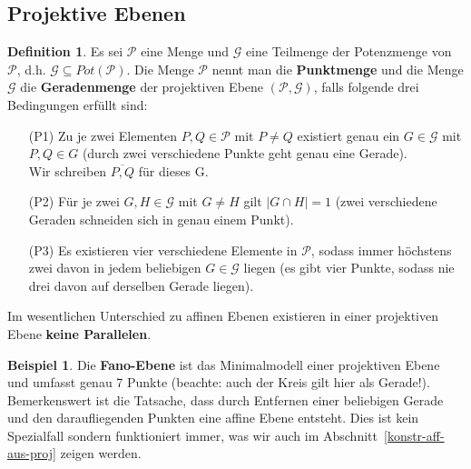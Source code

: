 \documentclass[hidelinks]{article}
\theoremstyle{plain}
\theoremstyle{definition}
\newtheorem{defn}[thm]{Definition}
\newtheorem{bsp}[thm]{Beispiel}
\theoremstyle{rem}
\begin{document}
\begin{sloppypar}
\subsection{Projektive Ebenen}
\begin{defn} \label{projektive-ebene}
Es sei $\mathcal{P}$ eine Menge und $\mathcal{G}$ eine Teilmenge der Potenzmenge von $\mathcal{P}$, d.h. $\mathcal{G}\subseteq Pot(\mathcal{P})$.
Die Menge $\mathcal{P}$ nennt man die \textbf{Punktmenge} und die Menge $\mathcal{G}$ die \textbf{Geradenmenge} der projektiven Ebene $(\mathcal{P},\mathcal{G})$, falls folgende drei Bedingungen erfüllt sind:
	\begin{enumerate}
		\item[(P1)] Zu je zwei Elementen $P, Q\in \mathcal{P}$ mit $P\ne Q$ existiert genau ein $G\in\mathcal{G}$ mit $P, Q \in G$ (durch zwei verschiedene Punkte geht genau eine Gerade).\\
		Wir schreiben $\overline{P,Q}$ für dieses G.
		\item[(P2)] Für je zwei $G,H\in\mathcal{G}$ mit $G\ne H$ gilt $|G\cap H|=1$ (zwei verschiedene Geraden schneiden sich in genau einem Punkt).
		\item[(P3)] Es existieren vier verschiedene Elemente in $\mathcal{P}$, sodass immer höchstens zwei davon in jedem beliebigen $G\in\mathcal{G}$ liegen (es gibt vier Punkte, sodass nie drei davon auf derselben Gerade liegen).
	\end{enumerate}
\end{defn}
Im wesentlichen Unterschied zu affinen Ebenen existieren in einer projektiven Ebene \textbf{keine Parallelen}.

\begin{bsp}\label{fano}
Die \textbf{Fano-Ebene} ist das Minimalmodell einer projektiven Ebene und umfasst genau 7 Punkte (beachte: auch der Kreis gilt hier als Gerade!).\cite[Seite~9]{projmin}\\
Bemerkenswert ist die Tatsache, dass durch Entfernen einer beliebigen Gerade und den daraufliegenden Punkten eine affine Ebene entsteht. Dies ist kein Spezialfall sondern funktioniert immer, was wir auch im Abschnitt~\ref{konstr-aff-aus-proj} zeigen werden.
\begin{figure}[H]
\centering
{}
\end{figure}
\end{bsp}
\end{sloppypar}
\end{document}
